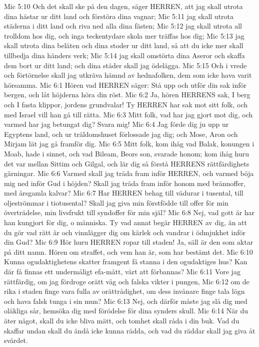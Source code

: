 Mic 5:10  Och det skall ske på den dagen, säger HERREN, att jag skall utrota dina hästar ur ditt land och förstöra dina vagnar;
Mic 5:11  jag skall utrota städerna i ditt land och riva ned alla dina fästen;
Mic 5:12  jag skall utrota all trolldom hos dig, och inga teckentydare skola mer träffas hos dig;
Mic 5:13  jag skall utrota dina beläten och dina stoder ur ditt land, så att du icke mer skall tillbedja dina händers verk;
Mic 5:14  jag skall omstörta dina Aseror och skaffa dem bort ur ditt land; och dina städer skall jag ödelägga.
Mic 5:15  Och i vrede och förtörnelse skall jag utkräva hämnd av hednafolken, dem som icke hava varit hörsamma.
Mic 6:1  Hören vad HERREN säger: Stå upp och utför din sak inför bergen, och låt höjderna höra din röst.
Mic 6:2  Ja, hören HERRENS sak, I berg och I fasta klippor, jordens grundvalar! Ty HERREN har sak mot sitt folk, och med Israel vill han gå till rätta.
Mic 6:3  Mitt folk, vad har jag gjort mot dig, och varmed har jag betungat dig? Svara mig!
Mic 6:4  Jag förde dig ju upp ur Egyptens land, och ur träldomshuset förlossade jag dig; och Mose, Aron och Mirjam lät jag gå framför dig.
Mic 6:5  Mitt folk, kom ihåg vad Balak, konungen i Moab, hade i sinnet, och vad Bileam, Beors son, svarade honom; kom ihåg huru det var mellan Sittim och Gilgal, och lär dig så förstå HERRENS rättfärdighets gärningar.
Mic 6:6  Varmed skall jag träda fram inför HERREN, och varmed böja mig ned inför Gud i höjden? Skall jag träda fram inför honom med brännoffer, med årsgamla kalvar?
Mic 6:7  Har HERREN behag till vädurar i tusental, till oljeströmmar i tiotusental? Skall jag giva min förstfödde till offer för min överträdelse, min livsfrukt till syndoffer för min själ?
Mic 6:8  Nej, vad gott är har han kungjort för dig, o människa. Ty vad annat begär HERREN av dig, än att du gör vad rätt är och vinnlägger dig om kärlek och vandrar i ödmjukhet inför din Gud?
Mic 6:9  Hör huru HERREN ropar till staden! Ja, säll är den som aktar på ditt namn. Hören om straffet, och vem han är, som har bestämt det.
Mic 6:10  Kunna ogudaktighetens skatter framgent få stanna i den ogudaktiges hus? Kan där få finnas ett undermåligt efa-mått, värt att förbannas?
Mic 6:11  Vore jag rättfärdig, om jag fördroge orätt våg och falska vikter i pungen,
Mic 6:12  om de rika i staden finge vara fulla av orättrådighet, om dess invånare finge tala lögn och hava falsk tunga i sin mun?
Mic 6:13  Nej, och därför måste jag slå dig med oläkliga sår, hemsöka dig med förödelse för dina synders skull.
Mic 6:14  När du äter något, skall du icke bliva mätt, och tomhet skall råda i din buk. Vad du skaffar undan skall du ändå icke kunna rädda, och vad du räddar skall jag giva åt svärdet.
